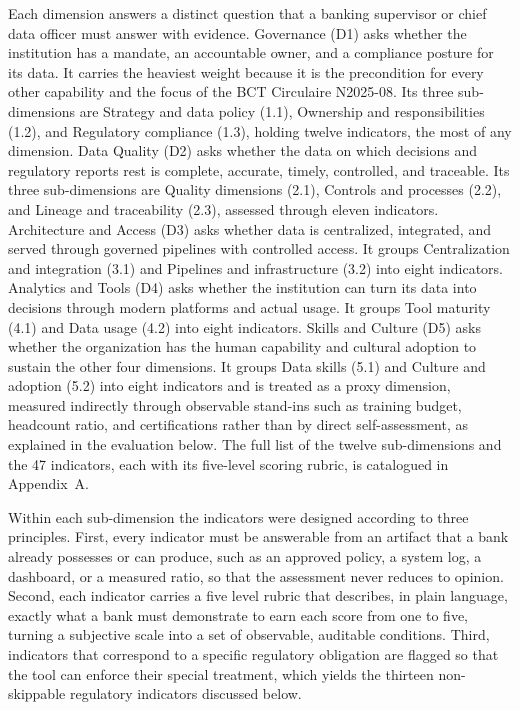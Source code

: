 Each dimension answers a distinct question that a banking supervisor or chief data officer must answer with evidence. Governance (D1) asks whether the institution has a mandate, an accountable owner, and a compliance posture for its data. It carries the heaviest weight because it is the precondition for every other capability and the focus of the BCT Circulaire N\textdegree{}2025-08. Its three sub-dimensions are Strategy and data policy (1.1), Ownership and responsibilities (1.2), and Regulatory compliance (1.3), holding twelve indicators, the most of any dimension. Data Quality (D2) asks whether the data on which decisions and regulatory reports rest is complete, accurate, timely, controlled, and traceable. Its three sub-dimensions are Quality dimensions (2.1), Controls and processes (2.2), and Lineage and traceability (2.3), assessed through eleven indicators. Architecture and Access (D3) asks whether data is centralized, integrated, and served through governed pipelines with controlled access. It groups Centralization and integration (3.1) and Pipelines and infrastructure (3.2) into eight indicators. Analytics and Tools (D4) asks whether the institution can turn its data into decisions through modern platforms and actual usage. It groups Tool maturity (4.1) and Data usage (4.2) into eight indicators. Skills and Culture (D5) asks whether the organization has the human capability and cultural adoption to sustain the other four dimensions. It groups Data skills (5.1) and Culture and adoption (5.2) into eight indicators and is treated as a proxy dimension, measured indirectly through observable stand-ins such as training budget, headcount ratio, and certifications rather than by direct self-assessment, as explained in the evaluation below. The full list of the twelve sub-dimensions and the 47 indicators, each with its five-level scoring rubric, is catalogued in Appendix~A.

Within each sub-dimension the indicators were designed according to three principles. First, every indicator must be answerable from an artifact that a bank already possesses or can produce, such as an approved policy, a system log, a dashboard, or a measured ratio, so that the assessment never reduces to opinion. Second, each indicator carries a five level rubric that describes, in plain language, exactly what a bank must demonstrate to earn each score from one to five, turning a subjective scale into a set of observable, auditable conditions. Third, indicators that correspond to a specific regulatory obligation are flagged so that the tool can enforce their special treatment, which yields the thirteen non-skippable regulatory indicators discussed below.

